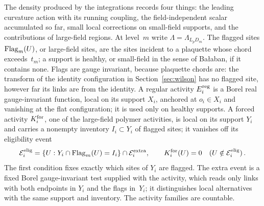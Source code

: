 The density produced by the integrations records four things: the leading curvature action with its running coupling, the field-independent scalar accumulated so far, small local corrections on small-field supports, and the contributions of large-field regions. At level~$m$ write $\Lambda=\Lambda_{L_pD_m}$. The flagged sites $\operatorname{Flag}_m(U)$, or large-field sites, are the sites incident to a plaquette whose chord exceeds~$t_m$; a support is healthy, or small-field in the sense of Ba\l{}aban, if it contains none. Flags are gauge invariant, because plaquette chords are: the transform of the identity configuration in Section~\ref{sec:wilson} has no flagged site, however far its links are from the identity. A regular activity $E_i^{\rm reg}$ is a Borel real gauge-invariant function, local on its support $X_i$, anchored at $o_i\in X_i$ and vanishing at the flat configuration; it is used only on healthy supports. A forced activity $K_i^{\rm for}$, one of the large-field polymer activities, is local on its support $Y_i$ and carries a nonempty inventory $I_i\subset Y_i$ of flagged sites; it vanishes off its eligibility event
\begin{equation}\label{eq:I12-forced-eligibility}
\mathcal E_i^{\rm elig}=\{U:Y_i\cap\operatorname{Flag}_m(U)=I_i\}\cap\mathcal E_i^{\rm extra},\qquad
K_i^{\rm for}(U)=0\quad(U\notin\mathcal E_i^{\rm elig})\,.
\end{equation}
The first condition fixes exactly which sites of $Y_i$ are flagged. The extra event is a fixed Borel gauge-invariant test supplied with the activity, which reads only links with both endpoints in $Y_i$ and the flags in~$Y_i$; it distinguishes local alternatives with the same support and inventory. The activity families are countable.

